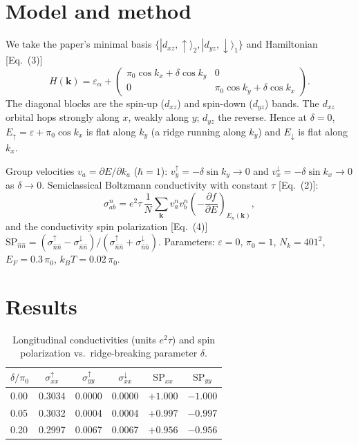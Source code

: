 \documentclass[aps,prl,twocolumn,superscriptaddress,floatfix]{revtex4-2}
\begin{document}
\section{Model and method}
We take the paper's minimal basis $\{|d_{xz},\uparrow\rangle_2,
|d_{yz},\downarrow\rangle_1\}$ and Hamiltonian [Eq.~(3)]
\begin{equation}
H(\bm k)=\varepsilon_\alpha+
\begin{pmatrix} \pi_0\cos k_x+\delta\cos k_y & 0\\ 0 & \pi_0\cos k_y+\delta\cos k_x\end{pmatrix}.
\end{equation}
The diagonal blocks are the spin-up ($d_{xz}$) and spin-down ($d_{yz}$) bands.
The $d_{xz}$ orbital hops strongly along $x$, weakly along $y$; $d_{yz}$ the
reverse. Hence at $\delta=0$, $E_\uparrow=\varepsilon+\pi_0\cos k_x$ is flat
along $k_y$ (a ridge running along $k_y$) and $E_\downarrow$ is flat along
$k_x$.

Group velocities $v_a=\partial E/\partial k_a$ ($\hbar=1$):
$v_y^\uparrow=-\delta\sin k_y\to0$ and $v_x^\downarrow=-\delta\sin k_x\to0$ as
$\delta\to0$. Semiclassical Boltzmann conductivity with constant $\tau$
[Eq.~(2)]:
\begin{equation}
\sigma_{ab}^{n}=e^2\tau\,\frac1N\sum_{\bm k} v_a^{n} v_b^{n}\left(-\frac{\partial f}{\partial E}\right)_{E_n(\bm k)} ,
\end{equation}
and the conductivity spin polarization [Eq.~(4)]
$\mathrm{SP}_{\hat n\hat n}=(\sigma_{\hat n\hat n}^\uparrow-\sigma_{\hat n\hat n}^\downarrow)/(\sigma_{\hat n\hat n}^\uparrow+\sigma_{\hat n\hat n}^\downarrow)$.
Parameters: $\varepsilon=0$, $\pi_0=1$, $N_k=401^2$, $E_F=0.3\,\pi_0$,
$k_BT=0.02\,\pi_0$.

\section{Results}
\begin{table}[t]
\caption{Longitudinal conductivities (units $e^2\tau$) and spin polarization
vs.\ ridge-breaking parameter $\delta$.}
\begin{ruledtabular}
\begin{tabular}{lccccc}
$\delta/\pi_0$ & $\sigma_{xx}^\uparrow$ & $\sigma_{yy}^\uparrow$ & $\sigma_{xx}^\downarrow$ & $\mathrm{SP}_{xx}$ & $\mathrm{SP}_{yy}$\\
\hline
0.00 & 0.3034 & 0.0000 & 0.0000 & $+1.000$ & $-1.000$\\
0.05 & 0.3032 & 0.0004 & 0.0004 & $+0.997$ & $-0.997$\\
0.20 & 0.2997 & 0.0067 & 0.0067 & $+0.956$ & $-0.956$\\
\end{tabular}
\end{ruledtabular}
\end{table}
\end{document}
